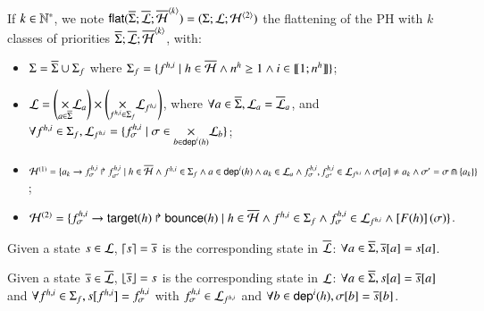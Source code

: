 \begin{definition}
  \label{def:flattening}
  If $k \in \mathbb{N}^*$, we note $\mathsf{flat}(\overline{\Sigma}; \overline{\mathcal{L}}; \overline{\mathcal{H}}^{{\langle k \rangle}}) = (\Sigma; \mathcal{L}; \mathcal{H}^{{\langle 2 \rangle}})$
  the flattening of the PH with $k$ classes of priorities $\overline{\Sigma}; \overline{\mathcal{L}}; \overline{\mathcal{H}}^{{\langle k \rangle}}$, with:
  \begin{itemize}
    \item $\Sigma = \overline{\Sigma} \cup \Sigma_f$
      where $\Sigma_f = \{ f^{h,i} \mid h \in \overline{\mathcal{H}} \wedge n^{h} \geq 1 \wedge i \in \llbracket 1; n^{h} \rrbracket \}$;
    \item $\mathcal{L} = \left( \underset{a \in \overline{\Sigma}}{\times} \mathcal{L}_{a} \right) \times
      \left(\underset{f^{h,i} \in \Sigma_f}{\times} \mathcal{L}_{f^{h,i}} \right)$,
      where $\forall a \in \overline{\Sigma}, \mathcal{L}_{a} = \overline{\mathcal{L}}_{a}$, and
      $\forall f^{h,i} \in \Sigma_f,
      \mathcal{L}_{f^{h,i}} = \{ f^{h,i}_\sigma \mid \sigma \in \underset{b \in \mathsf{dep}^{i}(h)}{\times} \mathcal{L}_{b} \}$;
    \item $\mathcal{H}^{(1)} = \{ a_k\rightarrow f^{h,i}_\sigma\Rsh f^{h,i}_{\sigma'} \mid
      h \in \overline{\mathcal{H}} \wedge
      f^{h,i} \in \Sigma_f \wedge
      a \in \mathsf{dep}^{i}(h) \wedge a_k \in \mathcal{L}_a \wedge
      f^{h,i}_\sigma , f^{h,i}_{\sigma'} \in \mathcal{L}_{f^{h,i}} \wedge
      {\sigma[a]} \neq a_k \wedge \sigma' = \sigma \Cap \{ a_k \} \}$;
    \item $\mathcal{H}^{(2)}=\{ f^{h,i}_\sigma\rightarrow\mathsf{target}(h)\Rsh\mathsf{bounce}(h) \mid
      h \in \overline{\mathcal{H}} \wedge 
      f^{h,i} \in \Sigma_f \wedge
      f^{h,i}_\sigma \in \mathcal{L}_{f^{h,i}} \wedge \left[F(h)\right](\sigma) \}$.
  \end{itemize}
  Given a state $s \in \mathcal{L}$, $\lceil s \rceil = \overline{s}$ is the corresponding state in $\overline{\mathcal{L}}$:
  $\forall a \in \overline{\Sigma}, {\overline{s}[a]} = {s[a]}$.

  \noindent
  Given a state $\overline{s} \in \overline{\mathcal{L}}$, $\lfloor \overline{s} \rfloor = s$ is the corresponding state in $\mathcal{L}$:
  $\forall a \in \overline{\Sigma}, {s[a]} = {\overline{s}[a]}$
  and $\forall f^{h,i} \in \Sigma_f, {s[f^{h,i}]} = f^{h,i}_\sigma$ with $f^{h,i}_\sigma \in \mathcal{L}_{f^{h,i}}$
  and $\forall b \in \mathsf{dep}^{i}(h), {\sigma[b]} = {\overline{s}[b]}$.
\end{definition}



